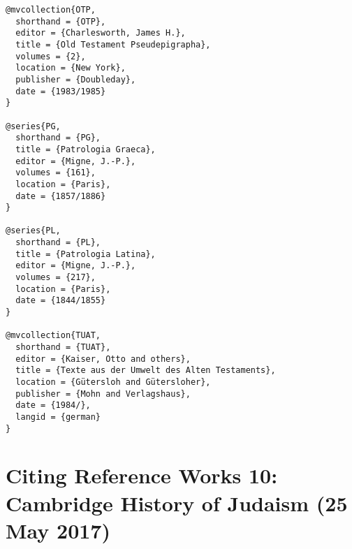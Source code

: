 \documentclass[a4paper]{article}
\begin{document}
\begin{verbatim}
@mvcollection{OTP,
  shorthand = {OTP},
  editor = {Charlesworth, James H.},
  title = {Old Testament Pseudepigrapha},
  volumes = {2},
  location = {New York},
  publisher = {Doubleday},
  date = {1983/1985}
}

@series{PG,
  shorthand = {PG},
  title = {Patrologia Graeca},
  editor = {Migne, J.-P.},
  volumes = {161},
  location = {Paris},
  date = {1857/1886}
}

@series{PL,
  shorthand = {PL},
  title = {Patrologia Latina},
  editor = {Migne, J.-P.},
  volumes = {217},
  location = {Paris},
  date = {1844/1855}
}

@mvcollection{TUAT,
  shorthand = {TUAT},
  editor = {Kaiser, Otto and others},
  title = {Texte aus der Umwelt des Alten Testaments},
  location = {Gütersloh and Gütersloher},
  publisher = {Mohn and Verlagshaus},
  date = {1984/},
  langid = {german}
}
\end{verbatim}

\begin{verbcite}
  \nocite{ANET, ANF:firsted, APOT, DSSSE, COS, MOTP, NHL, NHScr, NPNF:firsted,
    OTP, PG, PL, TUAT}
\end{verbcite}
\exampleabbreviations
{}

\section{Citing Reference Works 10: Cambridge History of Judaism (25 May 2017)}
\end{document}
